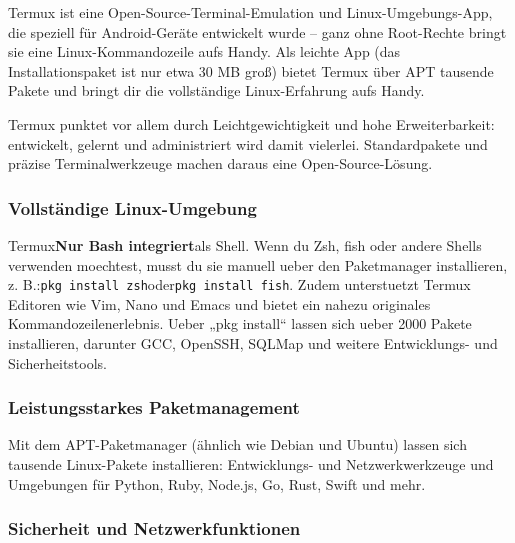 


Termux ist eine Open-Source-Terminal-Emulation und Linux-Umgebungs-App, die speziell für Android-Geräte entwickelt wurde – ganz ohne Root-Rechte bringt sie eine Linux-Kommandozeile aufs Handy. Als leichte App (das Installationspaket ist nur etwa 30 MB groß) bietet Termux über APT tausende Pakete und bringt dir die vollständige Linux-Erfahrung aufs Handy.

Termux punktet vor allem durch Leichtgewichtigkeit und hohe Erweiterbarkeit: entwickelt, gelernt und administriert wird damit vielerlei. Standardpakete und präzise Terminalwerkzeuge machen daraus eine Open-Source-Lösung.


\subsubsection*{Vollständige Linux-Umgebung}

Termux\textbf{Nur Bash integriert}als Shell. Wenn du Zsh, fish oder andere Shells verwenden moechtest, musst du sie manuell ueber den Paketmanager installieren, z. B.:\texttt{pkg install zsh}oder\texttt{pkg install fish}. Zudem unterstuetzt Termux Editoren wie Vim, Nano und Emacs und bietet ein nahezu originales Kommandozeilenerlebnis. Ueber „pkg install“ lassen sich ueber 2000 Pakete installieren, darunter GCC, OpenSSH, SQLMap und weitere Entwicklungs- und Sicherheitstools.

\subsubsection*{Leistungsstarkes Paketmanagement}

Mit dem APT-Paketmanager (ähnlich wie Debian und Ubuntu) lassen sich tausende Linux-Pakete installieren: Entwicklungs- und Netzwerkwerkzeuge und Umgebungen für Python, Ruby, Node.js, Go, Rust, Swift und mehr.

\subsubsection*{Sicherheit und Netzwerkfunktionen}

